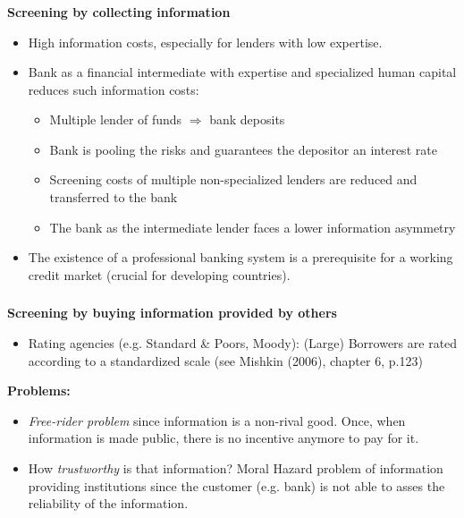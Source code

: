 \documentclass[11pt]{beamer}
\begin{document}
\begin{frame}
\frametitle{\insertsection}

\textbf{Screening by collecting information}

\begin{itemize}
\item High information costs, especially for lenders with low expertise.

\item Bank as a financial intermediate with expertise and specialized human capital reduces such information costs:
\begin{itemize}
\item Multiple lender of funds $\Rightarrow$ bank deposits
\item Bank is pooling the risks and guarantees the depositor an interest rate
\item Screening costs of multiple non-specialized lenders are reduced and transferred to the bank
\item The bank as the intermediate lender faces a lower information asymmetry
\end{itemize}

\item The existence of a professional banking system is a prerequisite for a working credit market (crucial for developing countries).
\end{itemize}
\end{frame}


\begin{frame}
\frametitle{\insertsection}

\textbf{Screening by buying information provided by others}

\begin{itemize}
\item Rating agencies (e.g. Standard \& Poors, Moody): (Large) Borrowers are rated according to a standardized scale (see Mishkin (2006), chapter 6, p.123)

\end{itemize}

\textbf{Problems:}

\begin{itemize}
\item \textit{Free-rider problem} since information is a non-rival good. Once, when information is made public, there is no incentive anymore to pay for it.

\item How \textit{trustworthy} is that information?  Moral Hazard problem of information providing institutions since the customer (e.g. bank) is not able to asses the reliability of the information.
\end{itemize}
\end{frame}
\end{document}
